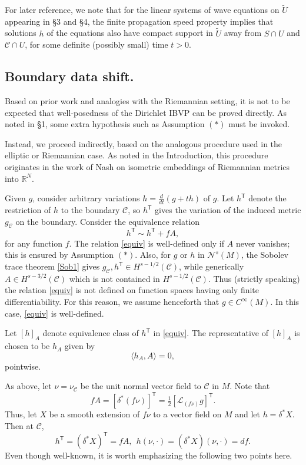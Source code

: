 \documentclass[10pt]{amsart}
\renewcommand{\d}{\delta}
\newcommand{\cC}{{\mathcal C}}
\newcommand{\cL}{{\mathcal L}}
\newcommand{\cN}{{\mathcal N}}
\newcommand{\bR}{\mathbb R}
\newcommand{\tT}{\mathsf{T}}
\newcommand{\be}{\begin{equation}}
\newcommand{\ee}{\end{equation}}
\newcommand{\<}{\langle}
\renewcommand{\>}{\rangle}
\newcommand{\w}{\widetilde}
\theoremstyle{plain}
\theoremstyle{remark}
\theoremstyle{definition}
\numberwithin{equation}{section}
\begin{document}
   For later reference, we note that for the linear systems of wave equations on $\w U$ appearing in \S 3 and \S 4, the finite propagation speed 
property implies that solutions $h$ of the equations also have compact support in $\w U$ away from $S\cap U$ and $\cC \cap U$, for some 
definite (possibly small) time $t > 0$. 


 
\subsection{Boundary data shift.}

  Based on prior work and analogies with the Riemannian setting, it is not to be expected that well-posedness of the Dirichlet IBVP can be proved directly. 
As noted in \S 1, some extra hypothesis such as Assumption $(*)$ must be invoked. 

   Instead, we proceed indirectly, based on the analogous procedure used in the elliptic or Riemannian case. As noted in the Introduction, 
this procedure originates in the work of Nash on isometric embeddings of Riemannian metrics into $\bR^N$. 

  Given $g$, consider arbitrary variations $h = \frac{d}{dt}(g + th)$ of $g$. Let $h^{\tT}$ denote the restriction of $h$ to the boundary $\cC$, 
so $h^{\tT}$ gives the variation of the induced metric $g_{\cC}$ on the boundary. Consider the equivalence relation 
\be \label{equiv}
h^{\tT} \sim h^{\tT} + fA,
\ee
for any function $f$. The relation \eqref{equiv} is well-defined only if $A$ never vanishes; this is ensured by Assumption $(*)$. Also, for $g$ or $h$ 
in $\cN^s(M)$, the Sobolev trace theorem \eqref{Sob1} gives $g_{\cC}, h^{\tT} \in H^{s-1/2}(\cC)$, while generically $A \in H^{s-3/2}(\cC)$ which is not 
contained in $H^{s-1/2}(\cC)$. Thus (strictly speaking) the relation \eqref{equiv} is not defined on function spaces having only finite differentiability. 
For this reason, we assume henceforth that $g \in C^{\infty}(M)$. In this case, \eqref{equiv} is well-defined. 

  Let $[h]_A$ denote equivalence class of $h^{\tT}$ in \eqref{equiv}. The representative of $[h]_A$ is chosen to be $h_A$ given by 
\be \label{orth}
\<h_A, A\> = 0,
\ee
pointwise. 

 As above, let $\nu = \nu_{\cC}$ be the unit normal vector field to $\cC$ in $M$. Note that 
$$fA = [\d^*(f\nu)]^{\tT} = \tfrac{1}{2}[\cL_{(f\nu)}g]^{\tT}.$$
Thus, let $X$ be a smooth extension of $f\nu$ to a vector field on $M$ and let $h = \d^*X$. Then at $\cC$,  
\be \label{normmove}
h^{\tT} = (\d^*X)^{\tT} = fA, \ \ h(\nu, \cdot) = (\d^* X)(\nu, \cdot) = df.
\ee
Even though well-known, it is worth emphasizing the following two points here. 
\end{document}
